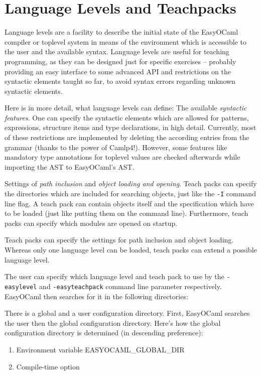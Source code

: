 
\section{Language Levels and Teachpacks}
\label{sec:teachpacks}

Language levels are a facility to describe the initial state of the 
EasyOCaml compiler or toplevel system in means of the environment which 
is accessible to the user and the available syntax.  Language levels are 
useful for teaching programming, as they can be designed just for 
specific exercises -- probably providing an easy interface to some 
advanced API and restrictions on the syntactic elements taught so far, 
to avoid syntax errors regarding unknown syntactic elements.

Here is in more detail, what language levels can define: The available 
\emph{syntactic features}.  One can specify the syntactic elements which 
are allowed for patterns, expressions, structure items and type 
declarations, in high detail. Currently, most of these restrictions are 
implemented by deleting the according entries from the grammar (thanks 
to the power of Camlp4!).  However, some features like mandatory type 
annotations for toplevel values are checked afterwards while importing 
the AST to EasyOCaml's AST.

Settings of \emph{path inclusion} and \emph{object loading and opening}.  
Teach packs can specify the directories which are included for searching 
objects, just like the \texttt{-I} command line flag.  A teach pack can 
contain objects itself and the specification which have to be loaded 
(just like putting them on the command line).  Furthermore, teach packs 
can specify which modules are opened on startup.

Teach packs can specify the settings for path inclusion and object 
loading. Whereas only one language level can be loaded, teach packs can 
extend a possible language level.

The user can specify which language level and teach pack to use by the 
\texttt{-easylevel} and \texttt{-easyteachpack} command line parameter 
respectively. EasyOCaml then searches for it in the following 
directories:

There is a global and a user configuration directory. First, EasyOCaml 
searches the user then the global configuration directory.  Here's how 
the global configuration directory is determined (in descending 
preference):

\begin{enumerate}
    \item Environment variable EASYOCAML\_GLOBAL\_DIR
    \item Compile-time option
\end{enumerate}

